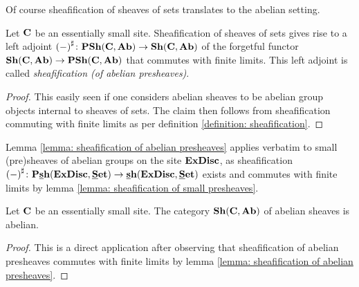 Of course sheafification of sheaves of sets translates to the abelian setting.
\begin{lemma}
	\label{lemma: sheafification of abelian presheaves}
	
	Let ${{\mathbf{C}}}$ be an essentially small site. Sheafification of sheaves of sets gives rise to a left adjoint $\sheafification{-}\colon \Presheaves{\site{C}}{\Ab}\to\Sheaves{\site{C}}{\Ab}$ of the forgetful functor $\Sheaves{\site{C}}{\Ab} \to \Presheaves{\site{C}}{\Ab}$ that commutes with finite limits. This left adjoint is called \emph{sheafification (of abelian presheaves)}.
\end{lemma}
\begin{proof}
	This easily seen if one considers abelian sheaves to be abelian group objects internal to sheaves of sets. The claim then follows from sheafification commuting with finite limits as per definition \ref{definition: sheafification}.
\end{proof}

\begin{remark}
	\label{remark: sheafification of small abelian presheaves}
	
	Lemma \ref{lemma: sheafification of abelian presheaves} applies verbatim to small (pre)sheaves of abelian groups on the site ${\mathbf{ExDisc}}$, as sheafification $\sheafification{-}\colon \smallPresheaves{\extremallyDisconnectedSets}{\Set} \to \smallSheaves{\extremallyDisconnectedSets}{\Set}$ exists and commutes with finite limits by lemma \ref{lemma: sheafification of small presheaves}.
\end{remark}

\begin{proposition}
	\label{proposition: abelian sheaves form an abelian category}
	
	Let ${{\mathbf{C}}}$ be an essentially small site. The category $\Sheaves{\site{C}}{\Ab}$ of abelian sheaves is abelian.
\end{proposition}
\begin{proof}
	This is a direct application \cite[\href{https://stacks.math.columbia.edu/tag/03A3}{Tag 03A3}]{stacks-project} after observing that sheafification of abelian presheaves commutes with finite limits by lemma \ref{lemma: sheafification of abelian presheaves}.
\end{proof}

